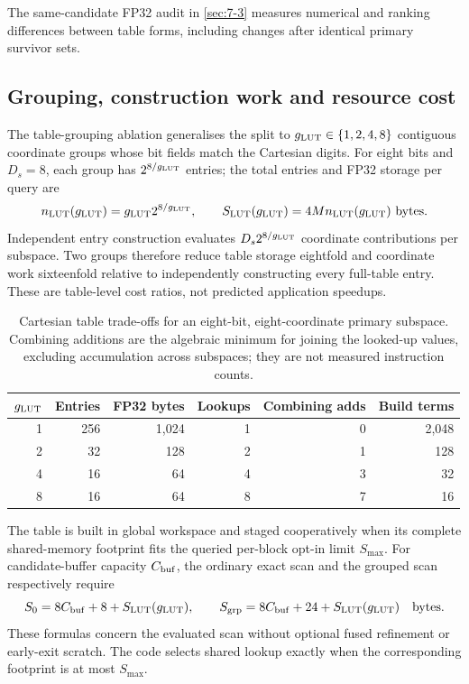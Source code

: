 The same-candidate FP32 audit in \cref{sec:7-3} measures numerical
and ranking differences between table forms, including changes after
identical primary survivor sets.


\subsection{Grouping, construction work and resource cost}

The table-grouping ablation generalises the split to $g_{\mathrm{LUT}}\in\{1,2,4,8\}$
contiguous coordinate groups whose bit fields match the Cartesian
digits. For eight bits and $D_s=8$, each group has $2^{8/g_{\mathrm{LUT}}}$ entries;
the total entries and FP32 storage per query are
\begin{equation}
 n_{\rm LUT}(g_{\mathrm{LUT}})=g_{\mathrm{LUT}} 2^{8/g_{\mathrm{LUT}}},\qquad S_{\rm LUT}(g_{\mathrm{LUT}})=4Mn_{\rm LUT}(g_{\mathrm{LUT}})\ \text{bytes}.
 \label{eq:5-lut-cost}
\end{equation}
Independent entry construction evaluates $D_s2^{8/g_{\mathrm{LUT}}}$ coordinate
contributions per subspace. Two groups therefore reduce table storage
eightfold and coordinate work sixteenfold relative to independently
constructing every full-table entry. These are table-level cost ratios,
not predicted application speedups.

\begin{table}[tbp]
\centering
\caption[Cartesian lookup-table trade-offs]{Cartesian table trade-offs for an eight-bit, eight-coordinate
primary subspace. Combining additions are the algebraic minimum for
joining the looked-up values, excluding accumulation across subspaces;
they are not measured instruction counts.}
\label{tab:5-lut-resources}
\small
\begin{tabular}{@{}rrrrrr@{}}
\toprule
$g_{\mathrm{LUT}}$ & Entries & FP32 bytes & Lookups & Combining adds & Build terms \\
\midrule
1 & 256 & 1,024 & 1 & 0 & 2,048 \\
2 & 32 & 128 & 2 & 1 & 128 \\
4 & 16 & 64 & 4 & 3 & 32 \\
8 & 16 & 64 & 8 & 7 & 16 \\
\bottomrule
\end{tabular}
\end{table}

The table is built in global workspace and staged cooperatively when
its complete shared-memory footprint fits the queried per-block opt-in
limit $S_{\max}$. For candidate-buffer capacity $C_{\rm buf}$, the
ordinary exact scan and the grouped scan respectively require
\begin{equation}
 S_0=8C_{\rm buf}+8+S_{\rm LUT}(g_{\mathrm{LUT}}),\qquad
 S_{\rm grp}=8C_{\rm buf}+24+S_{\rm LUT}(g_{\mathrm{LUT}})
 \quad\text{bytes}.
 \label{eq:5-shared-footprint}
\end{equation}
These formulas concern the evaluated scan without optional fused
refinement or early-exit scratch. The code selects shared lookup exactly
when the corresponding footprint is at most $S_{\max}$.

